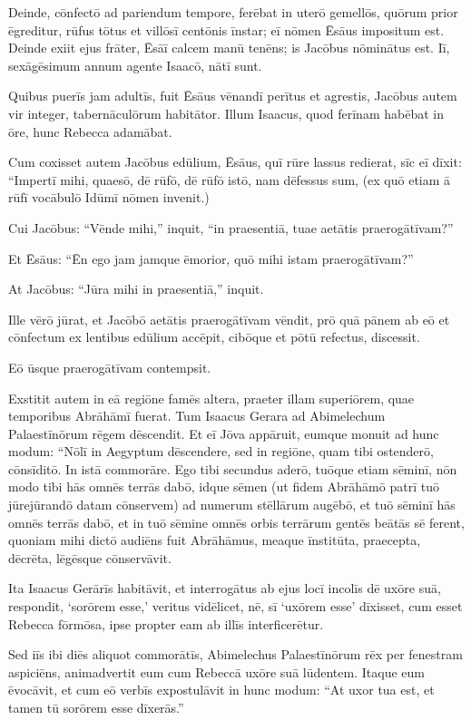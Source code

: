 \Versus Deinde, cōnfectō ad pariendum tempore, ferēbat in uterō gemellōs,
\Versus quōrum prior ēgreditur, rūfus tōtus et villōsī centōnis īnstar; eī nōmen Ēsāus impositum est.
\Versus Deinde exiit ejus frāter, Ēsāī calcem manū tenēns; is Jacōbus nōminātus est. Iī, sexāgēsimum annum agente Isaacō, nātī sunt.

\Versus Quibus puerīs jam adultīs, fuit Ēsāus vēnandī perītus et agrestis, Jacōbus autem vir integer, tabernāculōrum habitātor.
\Versus Illum Isaacus, quod ferīnam habēbat in ōre, hunc Rebecca adamābat.

\Versus Cum coxisset autem Jacōbus edūlium, Ēsāus, quī rūre lassus redierat, sīc eī dīxit:
\Versus ``Impertī mihi, quaesō, dē rūfō, dē rūfō istō, nam dēfessus sum, (ex quō etiam ā rūfī vocābulō Idūmī nōmen invenit.)

\Versus Cui Jacōbus: ``Vēnde mihi,'' inquit, ``in praesentiā, tuae aetātis praerogātīvam?''

\Versus Et Ēsāus: ``Ēn ego jam jamque ēmorior, quō mihi istam praerogātīvam?''

\Versus At Jacōbus: ``Jūra mihi in praesentiā,'' inquit.

Ille vērō jūrat, et Jacōbō aetātis praerogātīvam vēndit,
\Versus prō quā pānem ab eō et cōnfectum ex lentibus edūlium accēpit, cibōque et pōtū refectus, discessit.

Eō ūsque praerogātīvam contempsit.



\Caput
\Versus Exstitit autem in eā regiōne famēs altera, praeter illam superiōrem, quae temporibus Abrāhāmī fuerat. Tum Isaacus Gerara ad Abimelechum Palaestīnōrum rēgem dēscendit.
\Versus Et eī Jōva appāruit, eumque monuit ad hunc modum: ``Nōlī in Aegyptum dēscendere, sed in regiōne, quam tibi ostenderō, cōnsīditō.
\Versus  In istā commorāre. Ego tibi secundus aderō, tuōque etiam sēminī, nōn modo tibi hās omnēs terrās dabō, idque sēmen (ut fidem Abrāhāmō patrī tuō jūrejūrandō datam cōnservem)
\Versus ad numerum stēllārum augēbō, et tuō sēminī hās omnēs terrās dabō, et in tuō sēmine omnēs orbis terrārum gentēs beātās sē ferent,
\Versus quoniam mihi dictō audiēns fuit Abrāhāmus, meaque īnstitūta, praecepta, dēcrēta, lēgēsque cōnservāvit.

\Versus Ita Isaacus Gerārīs habitāvit,
\Versus et interrogātus ab ejus locī incolīs dē uxōre suā, respondit, `sorōrem esse,' veritus vidēlicet, nē, sī `uxōrem esse' dīxisset, cum esset Rebecca fōrmōsa, ipse propter eam ab illīs interficerētur.

\Versus Sed iīs ibi diēs aliquot commorātīs, Abimelechus Palaestīnōrum rēx per fenestram aspiciēns, animadvertit eum cum Rebeccā uxōre suā lūdentem.
\Versus Itaque eum ēvocāvit, et cum eō verbīs expostulāvit in hunc modum: ``At uxor tua est, et tamen tū sorōrem esse dīxerās.''

